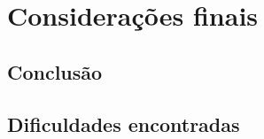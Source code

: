 \chapter[Considerações finais]{Considerações finais}

  \section*{Conclusão}
  
  \section*{Dificuldades encontradas}